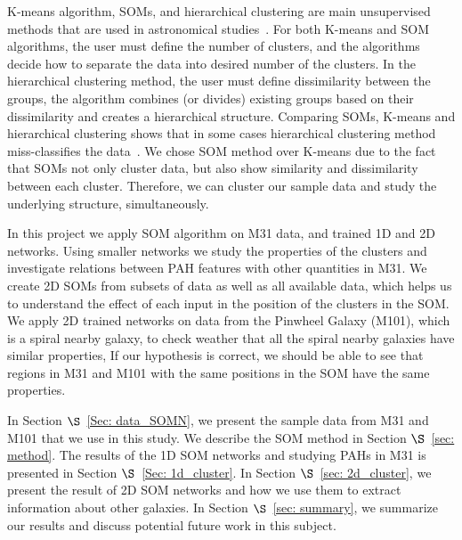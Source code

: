 K-means algorithm, SOMs, and hierarchical clustering are main unsupervised methods that are used in astronomical studies~\citep[e.g.][]{DAbrusco12, Aycha16}. %
For both K-means and SOM algorithms, the user must define the number of clusters, and the algorithms decide how to separate the data into desired number of the clusters.
In the hierarchical clustering method, the user must define dissimilarity between the groups, the algorithm combines (or divides) existing groups based on their dissimilarity and creates a hierarchical structure. 
Comparing SOMs, K-means and hierarchical clustering shows that in some cases hierarchical clustering method miss-classifies the data~\citep[][and references therein]{Mangiameli96}.
We chose SOM method over K-means due to the fact that SOMs not only cluster data, but also show similarity and dissimilarity between each cluster.
Therefore, we can cluster our sample data and study the underlying structure, simultaneously.

In this project we apply SOM algorithm on M31 data, and trained 1D and 2D networks.
Using smaller networks we study the properties of the clusters and investigate relations between PAH features with other quantities in M31.
We create 2D SOMs from subsets of data as well as all available data, which helps us to understand the effect of each input in the position of the clusters in the SOM.%
We apply 2D trained networks on data from the Pinwheel Galaxy (M101), which is a spiral nearby galaxy, to check weather that all the spiral nearby galaxies have similar properties,
If our hypothesis is correct, we should be able to see that regions in M31 and M101 with the same positions in the SOM have the same properties.

In Section $\S$~\ref{Sec: data_SOMN}, we present the sample data from M31 and M101 that we use in this study. 
We describe the SOM method in Section $\S$~\ref{sec: method}. 
The results of the 1D SOM networks and studying PAHs in M31 is presented in Section $\S$~\ref{Sec: 1d_cluster}.
In Section $\S$~\ref{sec: 2d_cluster}, we present the result of 2D SOM networks and how we use them to extract information about other galaxies.
In Section $\S$~\ref{sec: summary}, we summarize our results and discuss potential future work in this subject.




